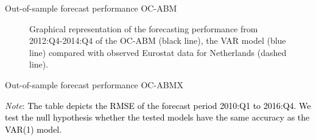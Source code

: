 \documentclass[9pt]{beamer}
\begin{document}
\begin{frame}{Out-of-sample forecast performance OC-ABM}
    \begin{figure}[!h]
	\centering
	
	\caption{Graphical representation of the forecasting performance from 2012:Q4-2014:Q4 of the OC-ABM (black line), the VAR model (blue line) compared with observed Eurostat data for Netherlands (dashed line).} \label{fig:gvamacro_gvaetal_y}
\end{figure}
\label{Forecastfigs}
\hyperlink{ForecastfigsReturn}{}

\end{frame}

\begin{frame}{Out-of-sample forecast performance OC-ABMX}
\label{HABMXtable}
   \begin{table}[!h]
	\caption{Conditional forecast performance } 
	\label{table:rmse_ABMx}
	\centering
	\begin{tablenotes}
		\footnotesize \item \textit{Note}: \textcolor{black}{The table depicts the RMSE of the forecast period 2010:Q1 to 201\textcolor{black}{6}:Q4.  We test the null hypothesis whether the tested models have the same accuracy as the VAR(1) model.}
	\end{tablenotes}
\end{table}
\hyperlink{ForecastTableReturn}{}
\end{frame}
\end{document}
